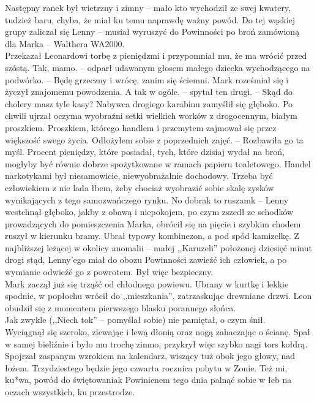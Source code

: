 \documentclass[../MAIN.tex]{subfiles}
\begin{document}
Następny ranek był wietrzny i zimny -- mało kto wychodził ze swej kwatery, tudzież baru, chyba, że miał ku temu naprawdę ważny powód. Do tej wąskiej grupy zaliczał się Lenny -- musiał wyruszyć do Powinności po broń zamówioną dla Marka -- Walthera WA2000. \\
Przekazał Leonardowi torbę z pieniędzmi i przypomniał mu, że ma wrócić przed szóstą.
\sx Tak, mamo. -- odparł udawanym głosem małego dziecka wychodzącego na podwórko. -- Będę grzeczny i wrócę, zanim się ściemni.
\qd
Mark roześmiał się i życzył znajomemu powodzenia.
\sx A tak w ogóle. -- spytał ten drugi. -- Skąd do cholery masz tyle kasy? \qd
%
Nabywca drogiego karabinu zamyślił się głęboko. Po chwili ujrzał oczyma wyobraźni setki wielkich worków z drogocennym, białym proszkiem. Proszkiem, którego handlem i przemytem zajmował się przez większość swego życia.
\sx Odłożyłem sobie z poprzednich zajęć. -- Rozbawiła go ta myśl.
\qd
Procent pieniędzy, które posiadał, tych, które dzisiaj wydał na broń, mogłyby być równie dobrze spożytkowane w ramach papieru toaletowego. Handel narkotykami był niesamowicie, niewyobrażalnie dochodowy. Trzeba być człowiekiem z nie lada łbem, żeby chociaż wyobrazić sobie skalę zysków wynikających z tego samozwańczego rynku.
\sx No dobra\3k to ruszam\3k -- Lenny westchnął głęboko, jakby z obawą i niepokojem, po czym zszedł ze schodków prowadzących do pomieszczenia Marka, obrócił się na pięcie i szybkim chodem ruszył w kierunku bramy.
\qd
Ubrał typowy kombinezon, a pod spód kamizelkę. Z najbliższej leżącej w okolicy anomalii -- małej ,,Karuzeli'' położonej dziesięć minut drogi stąd, Lenny’ego miał do obozu Powinności zawieźć ich człowiek, a po wymianie odwieźć go z powrotem. Był więc bezpieczny. \\
Mark zaczął już się trząść od chłodnego powiewu. Ubrany w kurtkę i lekkie spodnie, w popłochu wrócił do ,,mieszkania'', zatrzaskując drewniane drzwi.
%
%
Leon obudził się z momentem pierwszego blasku porannego słońca. \\
Jak zwykle (,,Niech to\3k'' -- pomyślał sobie) nie pamiętał, o czym śnił. \\
Wyciągnął się szeroko, ziewając i lewą dłonią oraz nogą zahaczając o ścianę. Spał w samej bieliźnie i było mu trochę zimno, przykrył więc szybko nagi tors kołdrą. Spojrzał zaspanym wzrokiem na kalendarz, wiszący tuż obok jego głowy, nad łożem.
Trzydziestego będzie jego czwarta rocznica pobytu w Zonie.
Też mi, ku*wa, powód do świętowania\3k Powinienem tego dnia palnąć sobie w łeb na oczach wszystkich, ku przestrodze.
\end{document}
